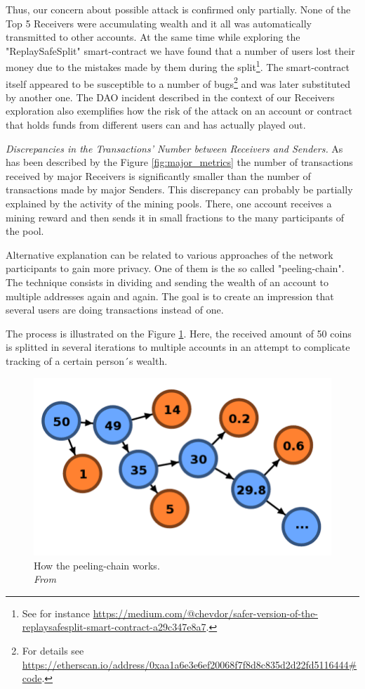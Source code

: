 Thus, our concern about possible attack is confirmed only partially.
None of the Top 5 Receivers were accumulating wealth and it all was automatically transmitted to other accounts.
At the same time while exploring the "ReplaySafeSplit" smart-contract we have found that a number of users lost their money due to the mistakes made by them during the split\footnote{See for instance \url{https://medium.com/@chevdor/safer-version-of-the-replaysafesplit-smart-contract-a29c347e8a7}.}.
The smart-contract itself appeared to be susceptible to a number of bugs\footnote{For details see \url{https://etherscan.io/address/0xaa1a6e3e6ef20068f7f8d8c835d2d22fd5116444\#code}.} and was later substituted by another one.
The DAO incident described in the context of our Receivers exploration also exemplifies how the risk of the attack on an account or contract that holds funds from different users can and has actually played out.

\textit{Discrepancies in the Transactions' Number between Receivers and Senders.} 
As has been described by the Figure \ref{fig:major_metrics} the number of transactions received by major Receivers is significantly smaller than the number of transactions made by major Senders.
This discrepancy can probably be partially explained by the activity of the mining pools.
There, one account receives a mining reward and then sends it in small fractions to the many participants of the pool.

Alternative explanation can be related to various approaches of the network participants to gain more privacy.
One of them is the so called "peeling-chain".
The technique consists in dividing and sending the wealth of an account to multiple addresses again and again.
The goal is to create an impression that several users are doing transactions instead of one.

The process is illustrated on the Figure \ref{fig:peeling_chain}.
Here, the received amount of 50 coins is splitted in several iterations to multiple accounts in an attempt to complicate tracking of a certain person´s wealth.

\begin{figure}[h]
  \centering
  \includegraphics[width=\linewidth]{figures/peeling_chain.png}
  \caption{How the peeling-chain works. \\
  \textit{From \cite{balthasar2017laundary}}}
  \label{fig:peeling_chain}
\end{figure}

